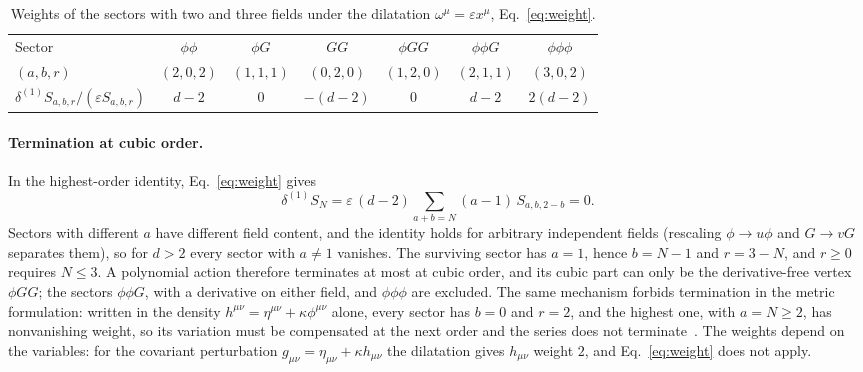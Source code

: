 \documentclass[prd,aps,preprint,nofootinbib,amsmath,amssymb,eqsecnum]{revtex4-2}
\begin{document}
\begin{table}[tb]
\centering
\setlength{\tabcolsep}{8pt}
\begin{tabular}{@{}lcccccc@{}}
\toprule
Sector & $\phi\phi$ & $\phi G$ & $GG$ & $\phi GG$ & $\phi\phi G$ & $\phi\phi\phi$ \\
$(a,b,r)$ & $(2,0,2)$ & $(1,1,1)$ & $(0,2,0)$ & $(1,2,0)$ & $(2,1,1)$ & $(3,0,2)$ \\
$\delta^{(1)}S_{a,b,r}/(\varepsilon S_{a,b,r})$ & $d-2$ & $0$ & $-(d-2)$ & $0$ & $d-2$ & $2(d-2)$ \\
\bottomrule
\end{tabular}
\caption{Weights of the sectors with two and three fields under the dilatation
$\omega^\mu=\varepsilon x^\mu$, Eq.~\eqref{eq:weight}.}
\label{tab:weights}
\end{table}

\paragraph{Termination at cubic order.} In the highest-order identity, Eq.~\eqref{eq:weight}
gives
\begin{equation}
\delta^{(1)}S_N=\varepsilon\,(d-2)\sum_{a+b=N}(a-1)\,S_{a,b,2-b}=0 .
\end{equation}
Sectors with different $a$ have different field content, and the identity holds for
arbitrary independent fields (rescaling $\phi\to u\phi$ and $G\to vG$ separates them), so
for $d>2$ every sector with $a\neq1$ vanishes. The surviving sector has $a=1$, hence $b=N-1$
and $r=3-N$, and $r\ge0$ requires $N\le3$. A polynomial action therefore terminates at most at
cubic order, and its cubic part can only be the derivative-free vertex $\phi GG$; the sectors
$\phi\phi G$, with a derivative on either field, and $\phi\phi\phi$ are excluded. The same
mechanism forbids termination in the metric formulation: written in the density
$h^{\mu\nu}=\eta^{\mu\nu}+\kappa\phi^{\mu\nu}$ alone, every sector has $b=0$ and $r=2$, and the
highest one, with $a=N\ge2$, has nonvanishing weight, so its variation must be compensated at
the next order and the series does not terminate~\cite{BrandtFrenkel1996}. The weights depend
on the variables: for the covariant perturbation $g_{\mu\nu}=\eta_{\mu\nu}+\kappa h_{\mu\nu}$
the dilatation gives $h_{\mu\nu}$ weight $2$, and Eq.~\eqref{eq:weight} does not apply.
\end{document}
